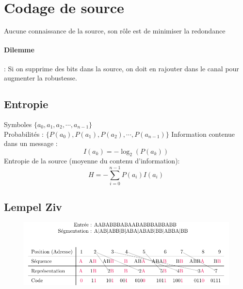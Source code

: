 \documentclass[resume]{subfiles}
\begin{document}
\section{Codage de source}
Aucune connaissance de la source, son rôle est de minimiser la redondance
\paragraph{Dilemme} : Si on supprime des bits dans la source, on doit en rajouter dans le canal pour augmenter la robustesse.
\subsection{Entropie}
Symboles $\lbrace a_0, a_1, a_2, \cdots, a_{n-1}\rbrace$\\
Probabilités : $\lbrace P(a_0), P(a_1), P(a_2), \cdots, P(a_{n-1})\rbrace$
Information contenue dans un message :
$$I(a_k)=-\log_2(P(a_k))$$
Entropie de la source (moyenne du contenu d'information):
$$H=-\sum_{i=0}^{n-1}P(a_i)I(a_i)$$
\subsection{Lempel Ziv}
\begin{figure}[H]
\centering
\includegraphics[width=\columnwidth]{drwg_0.pdf}
\end{figure}
\end{document}
